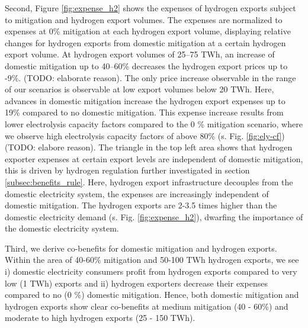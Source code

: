 Second, Figure \ref{fig:expense_h2} shows the expenses of hydrogen exports subject to mitigation and hydrogen export volumes. The expenses are normalized to expenses at 0\% mitigation at each hydrogen export volume, displaying relative changes for hydrogen exports from domestic mitigation at a certain hydrogen export volume.
At hydrogen export volumes of 25--75 TWh, an increase of domestic mitigation up to 40--60\% decreases the hydrogen export prices up to -9\%. (TODO: elaborate reason).
The only price increase observable in the range of our scenarios is observable at low export volumes below 20 TWh. Here, advances in domestic mitigation increase the hydrogen export expenses up to 19\% compared to no domestic mitigation.
This expense increase results from lower electrolysis capacity factors compared to the 0 \% mitigation scenario, where we observe high electrolysis capacity factors of above 80\% (s. Fig. \ref{fig:ely-cf}) (TODO: elabore reason).
The triangle in the top left area shows that hydrogen exporter expenses at certain export levels are independent of domestic mitigation, this is driven by hydrogen regulation further investigated in section \ref{subsec:benefits_rule}. Here, hydrogen export infrastructure decouples from the domestic electricity system, the expenses are increasingly independent of domestic mitigation. The hydrogen exports are 2-3.5 times higher than the domestic electricity demand (s. Fig. \ref{fig:expense_h2}), dwarfing the importance of the domestic electricity system.


Third, we derive co-benefits for domestic mitigation and hydrogen exports. 
Within the area of 40-60\% mitigation and 50-100 TWh hydrogen exports, we see i) domestic electricity consumers profit from hydrogen exports compared to very low (1 TWh) exports and ii) hydrogen exporters decrease their expenses compared to no (0 \%) domestic mitigation. Hence, both domestic mitigation and hydrogen exports show clear co-benefits at medium mitigation (40 - 60\%) and moderate to high hydrogen exports (25 - 150 TWh). 




